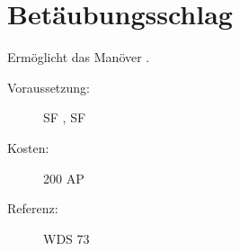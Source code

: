 \section{Betäubungsschlag}
\label{sf.betaeubungsschlag}
Ermöglicht das Manöver .
\begin{description}
    \item[Voraussetzung:]
        SF , SF 
    \item [Kosten:]
        200 AP
    \item [Referenz:]
        WDS 73
\end{description}
